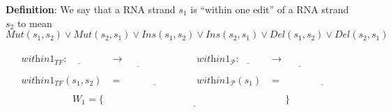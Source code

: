 \documentclass[12pt, oneside]{article}
\begin{document}
{\bf Definition}: We say that a RNA strand $s_1$ is ``within one edit'' of a RNA strand $s_2$ to mean
\[
Mut(s_1,s_2) \lor Mut(s_2,s_1) \lor Ins(s_1,s_2) \lor Ins(s_2, s_1) \lor Del(s_1, s_2) \lor Del(s_2,s_1)
\]

\[
\begin{array}{ll}
    \begin{array}{lll}
    & \textit{within1}_{TF} : \underline{\phantom{S \times S}} & \to \underline{\phantom{\{T, F\}}} \\
    \\
    & \textit{within1}_{TF}(s_1, s_2) & = \underline{\phantom{\textrm{``CHECK if within 1 edit''}}} \\
    \end{array}
&


    \begin{array}{lll}
    & \textit{within1}_{\mathcal{P}} : \underline{\phantom{S \hspace{1em}}} & \to \underline{\phantom{\mathcal{P}(S)}} \\
    \\
    & \textit{within1}_{\mathcal{P}}(s_1) & = \underline{\phantom{\textrm{``COMPUTE all within 1 edit''}}} \\
    \end{array}
\end{array}
\]
\[
W_1 = \{ \underline{\phantom{(s_1, s_2) \in S \times S ~\mid~ s_1, s_2 \textrm{ are within 1 edit}}}\}
\]

\vfill
\end{document}
